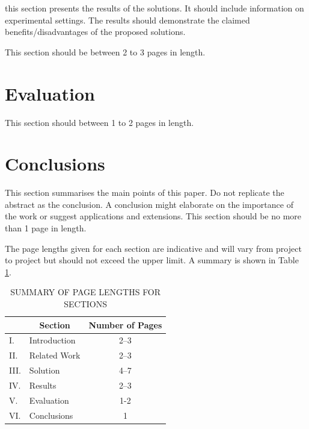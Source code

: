 \documentclass[12pt,a4paper]{article}
\begin{document}
this section presents the results of the solutions.  It should include information on experimental settings.  The results should demonstrate the claimed benefits/disadvantages of the proposed solutions.

This section should be between 2 to 3 pages in length.
\newpage
\section{Evaluation}

This section should between 1 to 2 pages in length.
\newpage
\section{Conclusions}

This section summarises the main points of this paper.  Do not replicate the abstract as the conclusion.  A conclusion might elaborate on the importance of the work or suggest applications and extensions.  This section should be no more than 1 page in length.

The page lengths given for each section are indicative and will vary from project to project but should not exceed the upper limit.  A summary is shown in Table \ref{summary}.

\begin{table}[htb]
    \centering
    \caption{SUMMARY OF PAGE LENGTHS FOR SECTIONS}
    \vspace*{6pt}
    \label{summary}
    \begin{tabular}{|ll|c|} \hline
             & \multicolumn{1}{c|}{\bf Section} & {\bf Number of Pages} \\ \hline
        I.   & Introduction                     & 2--3                  \\ \hline
        II.  & Related Work                     & 2--3                  \\ \hline
        III. & Solution                         & 4--7                  \\ \hline
        IV.  & Results                          & 2--3                  \\ \hline
        V.   & Evaluation                       & 1-2                   \\ \hline
        VI.  & Conclusions                      & 1                     \\ \hline
    \end{tabular}
\end{table}

\newpage

\end{document}

